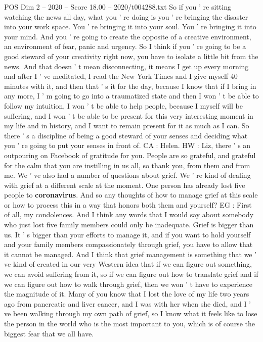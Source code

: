 \begin{textsample}{POS Dim 2 – 2020 – Score 18.00 – 2020/t004288.txt}
So if you ' re sitting watching the news all day, what you ' re doing is you ' re bringing the disaster into your work space.
You ' re bringing it into your soul.
You ' re bringing it into your mind.
And you ' re going to create the opposite of a creative environment, an environment of fear, panic and urgency.
So I think if you ' re going to be a good steward of your creativity right now, you have to isolate a little bit from the news.
And that doesn ' t mean disconnecting, it means I get up every morning and after I ' ve meditated, I read the New York Times and I give myself 40 minutes with it, and then that ' s it for the day, because I know that if I bring in any more, I ' m going to go into a traumatized state and then I won ' t be able to follow my intuition, I won ' t be able to help people, because I myself will be suffering, and I won ' t be able to be present for this very interesting moment in my life and in history, and I want to remain present for it as much as I can.
So there ' s a discipline of being a good steward of your senses and deciding what you ' re going to put your senses in front of.
CA : Helen.
HW : Liz, there ' s an outpouring on Facebook of gratitude for you.
People are so grateful, and grateful for the calm that you are instilling in us all, so thank you, from them and from me.
We ' ve also had a number of questions about grief.
We ' re kind of dealing with grief at a different scale at the moment.
One person has already lost five people to \textbf{coronavirus}.
And so any thoughts of how to manage grief at this scale or how to process this in a way that honors both them and yourself?
EG : First of all, my condolences.
And I think any words that I would say about somebody who just lost five family members could only be inadequate.
Grief is bigger than us.
It ' s bigger than your efforts to manage it, and if you want to hold yourself and your family members compassionately through grief, you have to allow that it cannot be managed.
And I think that grief management is something that we ' ve kind of created in our very Western idea that if we can figure out something, we can avoid suffering from it, so if we can figure out how to translate grief and if we can figure out how to walk through grief, then we won ' t have to experience the magnitude of it.
Many of you know that I lost the love of my life two years ago from pancreatic and liver cancer, and I was with her when she died, and I ' ve been walking through my own path of grief, so I know what it feels like to lose the person in the world who is the most important to you, which is of course the biggest fear that we all have.

\end{textsample}
